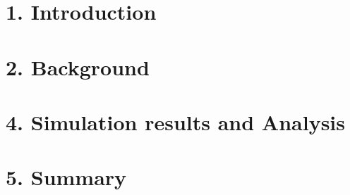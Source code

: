 \newpage\phantom{}

\newpage\phantom{}
\section{1. Introduction}
\section{2. Background}

\section{4. Simulation results and Analysis}
\section{5. Summary}

